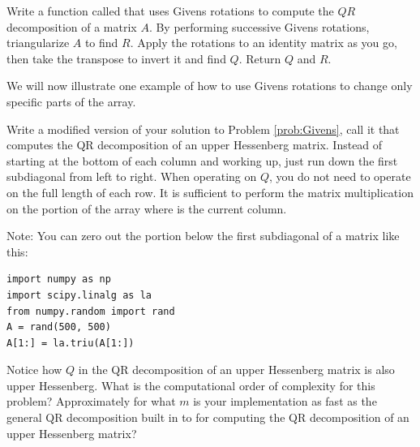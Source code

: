 \begin{problem}
\label{prob:Givens}
Write a function called  that uses Givens rotations to compute the $QR$ decomposition of
a matrix $A$.
By performing successive Givens rotations, triangularize $A$ to find $R$.
Apply the rotations to an identity matrix as you go, then take the transpose to invert it and find $Q$.
Return $Q$ and $R$.
\end{problem}

We will now illustrate one example of how to use Givens rotations to change only specific parts of the array.

\begin{problem}
\label{prob:givens_hessenberg}
Write a modified version of your solution to Problem \ref{prob:Givens}, call it  that computes the 
QR decomposition of an upper Hessenberg matrix.
Instead of starting at the bottom of each column and working up, just run down the first subdiagonal from left to right.
When operating on $Q$, you do not need to operate on the full length of each row.
It is sufficient to perform the matrix multiplication on the portion of the array  where  is the current column.

Note: You can zero out the portion below the first subdiagonal of a matrix like this:
\begin{lstlisting}
import numpy as np
import scipy.linalg as la
from numpy.random import rand
A = rand(500, 500)
A[1:] = la.triu(A[1:])
\end{lstlisting}

Notice how $Q$ in the QR decomposition of an upper Hessenberg matrix is also upper Hessenberg.
What is the computational order of  complexity for this problem?
Approximately for what $m$ is your implementation as fast as the general QR decomposition built in to  for computing the QR decomposition of an upper Hessenberg matrix?
\end{problem}

